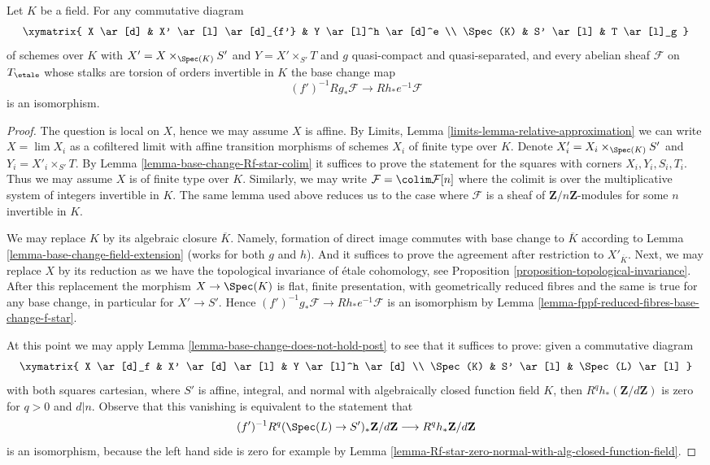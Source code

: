 \begin{lemma}
\label{lemma-punctual-base-change}
Let $K$ be a field. For any commutative diagram
$$
\xymatrix{
X \ar[d] & X' \ar[l] \ar[d]_{f'} & Y \ar[l]^h \ar[d]^e \\
\Spec(K) & S' \ar[l] & T \ar[l]_g
}
$$
of schemes over $K$ with
$X' = X \times_{\Spec(K)} S'$ and $Y = X' \times_{S'} T$ and
$g$ quasi-compact and quasi-separated, and every abelian sheaf
$\mathcal{F}$ on $T_\etale$ whose stalks are torsion of orders
invertible in $K$ the base change map
$$
(f')^{-1}Rg_*\mathcal{F}
\longrightarrow
Rh_*e^{-1}\mathcal{F}
$$
is an isomorphism.
\end{lemma}

\begin{proof}
The question is local on $X$, hence we may assume $X$ is affine.
By Limits, Lemma \ref{limits-lemma-relative-approximation}
we can write $X = \lim X_i$ as a cofiltered limit with affine
transition morphisms of schemes $X_i$ of finite type over $K$.
Denote $X'_i =  X_i \times_{\Spec(K)} S'$ and $Y_i = X'_i \times_{S'} T$.
By Lemma \ref{lemma-base-change-Rf-star-colim}
it suffices to prove the statement for the squares
with corners $X_i, Y_i, S_i, T_i$.
Thus we may assume $X$ is of finite type over $K$.
Similarly, we may write
$\mathcal{F} = \colim \mathcal{F}[n]$ where the colimit
is over the multiplicative system of integers invertible in $K$.
The same lemma used above reduces us to the case where
$\mathcal{F}$ is a sheaf of $\mathbf{Z}/n\mathbf{Z}$-modules
for some $n$ invertible in $K$.

\medskip\noindent
We may replace $K$ by its algebraic closure $\overline{K}$.
Namely, formation of direct image commutes with base change
to $\overline{K}$ according to
Lemma \ref{lemma-base-change-field-extension} (works for both
$g$ and $h$). And it suffices to prove the agreement after
restriction to $X'_{\overline{K}}$. Next, we may replace
$X$ by its reduction as we have the topological invariance of \'etale
cohomology, see
Proposition \ref{proposition-topological-invariance}.
After this replacement the morphism $X \to \Spec(K)$
is flat, finite presentation, with geometrically reduced fibres
and the same is true for any base change, in particular for $X' \to S'$.
Hence $(f')^{-1}g_*\mathcal{F} \to Rh_*e^{-1}\mathcal{F}$
is an isomorphism by Lemma \ref{lemma-fppf-reduced-fibres-base-change-f-star}.

\medskip\noindent
At this point we may apply
Lemma \ref{lemma-base-change-does-not-hold-post}
to see that it suffices to prove: given a commutative diagram
$$
\xymatrix{
X \ar[d]_f & X' \ar[d] \ar[l] & Y \ar[l]^h \ar[d] \\
\Spec(K) & S' \ar[l] & \Spec(L) \ar[l]
}
$$
with both squares cartesian, where $S'$ is affine, integral, and normal
with algebraically closed function field $K$, then
$R^qh_*(\mathbf{Z}/d\mathbf{Z})$ is zero for $q > 0$ and $d | n$.
Observe that this vanishing is equivalent to the statement that
$$
(f')^{-1}R^q(\Spec(L) \to S')_*\mathbf{Z}/d\mathbf{Z}
\longrightarrow
R^qh_*\mathbf{Z}/d\mathbf{Z}
$$
is an isomorphism, because the left hand side is zero for example by
Lemma \ref{lemma-Rf-star-zero-normal-with-alg-closed-function-field}.


\end{proof}
